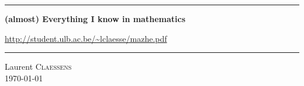 
\thispagestyle{empty}
\begin{center}
  \begin{minipage}{15cm}
    \hrule\par
    \vspace{2mm}
    \begin{center}
    \Huge \bfseries (almost) Everything I know in mathematics \par
    \normalsize
    \url{http://student.ulb.ac.be/~lclaesse/mazhe.pdf}
    \end{center}
    \hrule\par
  \end{minipage}
\end{center}

\vspace{2cm}

\begin{center}
    Laurent \textsc{Claessens}\\
    \today\\
\end{center}

\vfill

\LogoEtLicence
\clearpage


